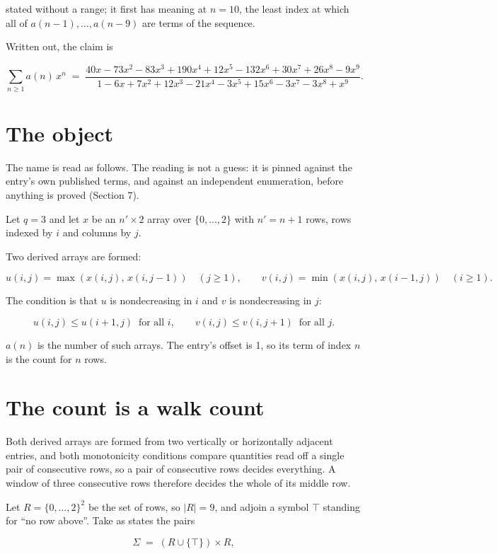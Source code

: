 \documentclass[11pt]{article}
\theoremstyle{definition}
\begin{document}
stated without a range; it first has meaning at $n = 10$, the least index at which all of $a(n-1),\dots,a(n-9)$ are terms of the sequence.

Written out, the claim is

\[\sum_{n \ge 1} a(n)\,x^n \;=\; \frac{40x - 73x^{2} - 83x^{3} + 190x^{4} + 12x^{5} - 132x^{6} + 30x^{7} + 26x^{8} - 9x^{9}}{1 - 6x + 7x^{2} + 12x^{3} - 21x^{4} - 3x^{5} + 15x^{6} - 3x^{7} - 3x^{8} + x^{9}}.\]

\section{The object}

The name is read as follows. The reading is not a guess: it is pinned against the entry's own published terms, and against an independent enumeration, before anything is proved (Section 7).

Let $q = 3$ and let $x$ be an $n' \times 2$ array over $\{0,\dots,2\}$ with $n' = n + 1$ rows, rows indexed by $i$ and columns by $j$.

Two derived arrays are formed:

\[u(i,j) = \max(x(i,j),\,x(i,j{-}1))\quad (j \ge 1), \qquad v(i,j) = \min(x(i,j),\,x(i{-}1,j))\quad (i \ge 1).\]

The condition is that $u$ is nondecreasing in $i$ and $v$ is nondecreasing in $j$:

\[u(i,j) \le u(i{+}1,j) \ \text{ for all } i, \qquad v(i,j) \le v(i,j{+}1) \ \text{ for all } j.\]

$a(n)$ is the number of such arrays. The entry's offset is 1, so its term of index $n$ is the count for $n$ rows.

\section{The count is a walk count}

Both derived arrays are formed from two vertically or horizontally adjacent entries, and both monotonicity conditions compare quantities read off a single pair of consecutive rows, so a pair of consecutive rows decides everything. A window of three consecutive rows therefore decides the whole of its middle row.

Let $R = \{0,\dots,2\}^{2}$ be the set of rows, so $|R| = 9$, and adjoin a symbol $\top$ standing for ``no row above''. Take as states the pairs

\[\Sigma \;=\; (R \cup \{\top\}) \times R,\]
\end{document}
